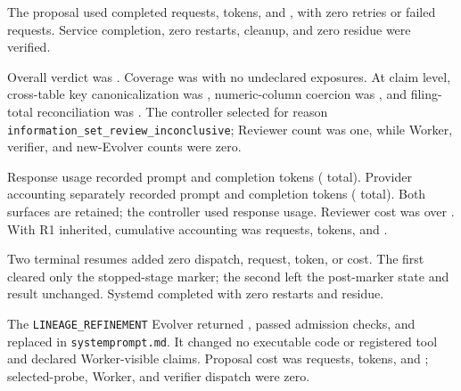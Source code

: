 The proposal used \HoldingsProposalRequests{} completed requests,
\HoldingsProposalTokens{} tokens, and \HoldingsProposalCost{}, with zero
retries or failed requests. Service completion, zero restarts, cleanup, and
zero residue were verified. 

 Overall verdict was
\HoldingsReviewOverall{}. Coverage was \HoldingsReviewCoverage{} with no
undeclared exposures. At claim level, cross-table key canonicalization was
\HoldingsReviewCanonicalization{}, numeric-column coercion was
\HoldingsReviewNumericCoercion{}, and filing-total reconciliation was
\HoldingsReviewReconciliation{}. The controller selected
\HoldingsReviewDecision{} for reason
\texttt{information\_set\_review\_inconclusive}; Reviewer count was one, while
Worker, verifier, and new-Evolver counts were zero.

Response usage recorded \HoldingsReviewResponsePrompt{} prompt and
\HoldingsReviewResponseCompletion{} completion tokens
(\HoldingsReviewResponseTokens{} total). Provider accounting separately
recorded \HoldingsReviewProviderPrompt{} prompt and
\HoldingsReviewProviderCompletion{} completion tokens
(\HoldingsReviewProviderTokens{} total). Both surfaces are retained; the
controller used response usage. Reviewer cost was \HoldingsReviewCost{} over
\HoldingsReviewWall{}. With R1 inherited, cumulative accounting was
\HoldingsReviewCumulativeRequests{} requests,
\HoldingsReviewCumulativeTokens{} tokens, and
\HoldingsReviewCumulativeCost{}.

Two terminal resumes added zero dispatch, request, token, or cost. The first
cleared only the stopped-stage marker; the second left the post-marker state
and result unchanged. Systemd completed with zero restarts and residue.

 The \texttt{LINEAGE\_REFINEMENT} Evolver returned
\HoldingsRefineProposalDecision{}, passed \HoldingsRefineProposalAdmission{}
admission checks, and replaced \HoldingsRefineProposalMutation{} in
\texttt{systemprompt.md}. It changed no executable code or registered tool and
declared \HoldingsRefineProposalClaims{} Worker-visible claims. Proposal cost
was \HoldingsRefineProposalRequests{} requests,
\HoldingsRefineProposalTokens{} tokens, and
\HoldingsRefineProposalCost{}; selected-probe, Worker, and verifier dispatch
were zero.

